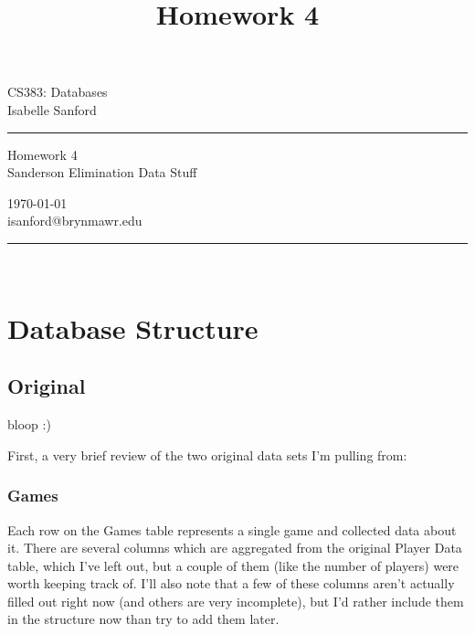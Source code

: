 \documentclass[11pt, oneside]{amsart}   	%
\begin{document}
\title{Homework 4} %
\fancyhead[C]{}
\begin{minipage}{0.295\textwidth} %
\raggedright
CS383: Databases\\ %
\footnotesize %
Isabelle Sanford %
\medskip\hrule
\end{minipage}
\begin{minipage}{0.4\textwidth} %
\centering 
\large %
Homework 4\\ %
\normalsize %
Sanderson Elimination Data Stuff \\ %
\end{minipage}
\begin{minipage}{0.295\textwidth} %
\raggedleft
\today \\
\footnotesize %
isanford@brynmawr.edu%
\medskip\hrule
\end{minipage}\\

\section{Database Structure}

\subsection{Original}
bloop :)

First, a very brief review of the two original data sets I'm pulling from:


\subsubsection{Games}
Each row on the Games table represents a single game and collected data about it. There are several columns which are aggregated from the original Player Data table, which I've left out, but a couple of them (like the number of players) were worth keeping track of. I'll also note that a few of these columns aren't actually filled out right now (and others are very incomplete), but I'd rather include them in the structure now than try to add them later. 
\end{document}
